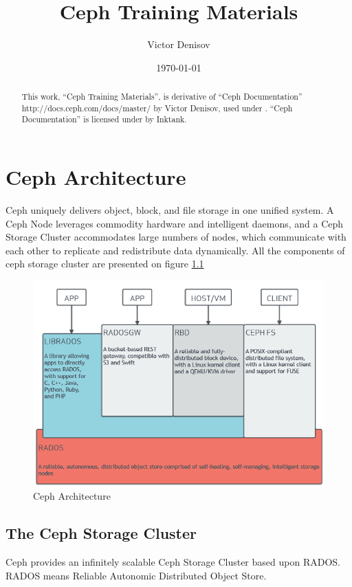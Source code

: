 \documentclass[12pt,a4paper]{report}
\title{Ceph Training Materials}
\author{Victor Denisov}
\date{\today}
\begin{document}
   \maketitle
\begin{abstract}
This work, ``Ceph Training Materials'', is derivative of ``Ceph Documentation'' http://docs.ceph.com/docs/master/ by Victor Denisov, used under \bysa. ``Ceph Documentation'' is licensed under \bysa by Inktank.
\end{abstract}

\makeatletter
\DeclareRobustCommand{\em}{%
  \@nomath\em \if b\expandafter\@car\f@series\@nil
  \normalfont \else \bfseries \fi}
\makeatother

\chapter{Ceph Architecture}
Ceph uniquely delivers object, block, and file storage in one unified system.
A Ceph Node leverages commodity hardware and intelligent daemons, and a Ceph
Storage Cluster accommodates large numbers of nodes, which communicate with
each other to replicate and redistribute data dynamically. All the components
of ceph storage cluster are presented on figure \ref{fig:ceph_architecture}

\begin{figure}[h]
	\includegraphics[scale=0.5]{stack.png}
	\caption{Ceph Architecture}
	\label{fig:ceph_architecture}
\end{figure}

\section{The Ceph Storage Cluster}
Ceph provides an infinitely scalable Ceph Storage Cluster based upon RADOS.
RADOS means Reliable Autonomic Distributed Object Store.
\end{document}
